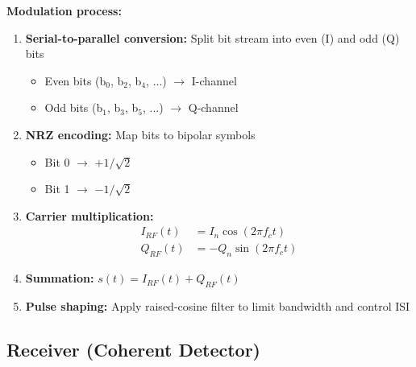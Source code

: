 \textbf{Modulation process:}
\begin{enumerate}
\item \textbf{Serial-to-parallel conversion:} Split bit stream into even (I) and odd (Q) bits
  \begin{itemize}
  \item Even bits (b$_0$, b$_2$, b$_4$, ...) $\rightarrow$ I-channel
  \item Odd bits (b$_1$, b$_3$, b$_5$, ...) $\rightarrow$ Q-channel
  \end{itemize}
\item \textbf{NRZ encoding:} Map bits to bipolar symbols
  \begin{itemize}
  \item Bit 0 $\rightarrow$ $+1/\sqrt{2}$
  \item Bit 1 $\rightarrow$ $-1/\sqrt{2}$
  \end{itemize}
\item \textbf{Carrier multiplication:}
  \begin{align}
  I_{RF}(t) &= I_n \cos(2\pi f_c t) \\
  Q_{RF}(t) &= -Q_n \sin(2\pi f_c t)
  \end{align}
\item \textbf{Summation:} $s(t) = I_{RF}(t) + Q_{RF}(t)$
\item \textbf{Pulse shaping:} Apply raised-cosine filter to limit bandwidth and control ISI
\end{enumerate}

\subsection{Receiver (Coherent Detector)}

